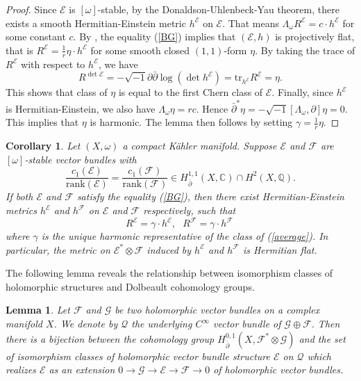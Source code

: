 \documentclass[english,reqno]{amsart}
\newcommand\sE{{\mathscr E}}
\newcommand\sF{{\mathscr F}}
\newcommand\sG{{\mathscr G}}
\newcommand\sQ{{\mathscr Q}}
\newcommand\bp{{\bar\partial}}
\theoremstyle{plain}
\newtheorem{lemma}[thm]{Lemma}
\newtheorem{cor}[thm]{Corollary}
\theoremstyle{definition}
\numberwithin{equation}{section} %
\begin{document}
\begin{proof}
    Since $\sE$ is $[\omega]$-stable, by the
    Donaldson-Uhlenbeck-Yau theorem, there exists a smooth
    Hermitian-Einstein metric $h^\sE$ on $\sE$. That means $\Lambda_\omega
    R^\sE=c\cdot h^\sE$ for some constant $c$. By \cite[Theorem 4.4.7]{Kobayashi2014}, the equality (\ref{BG}) implies that
    $(\sE,h)$ is  projectively flat, that is $R^\sE=\frac{1}{r} \eta \cdot h^\sE$
    for some  smooth closed $(1,1)$-form $\eta$. By taking the trace of $R^\sE$ with
    respect to $h^\sE$, we have $$R^{\det \sE}=-\sqrt{-1} \partial \bp\log(\det
    h^\sE)=\mathrm{tr}_{h^\sE} R^\sE=\eta.$$ This shows that class of  $\eta$ is equal to the first Chern class of $\sE$.
    Finally, since $h^\sE$ is Hermitian-Einstein, we also have
    $\Lambda_\omega \eta=rc$.
    Hence  $\bp^*\eta=-\sqrt{-1}[\Lambda_\omega,\partial]\eta=0$. This implies that $\eta$ is  harmonic. The lemma then follows by setting $\gamma=\frac{1}{r}\eta.$
\end{proof}



\begin{cor}\label{DUY}
    Let $(X,\omega)$ a compact K\"ahler manifold. Suppose $\sE$ and $\sF$
    are $[\omega]$-stable vector bundles with
    \begin{equation}\label{average}
    \frac{c_1(\sE)}{\mathrm{rank}(\sE)}=\frac{c_1(\sF)}{\mathrm{rank}(\sF)}\in
    H_{\bp}^{1,1}(X,\mathbb{C})\cap H^2(X,\mathbb{Q}).
    \end{equation}
    If both $\sE$
    and $\sF$ satisfy the equality (\ref{BG}), then there exist Hermitian-Einstein
    metrics $h^\sE$ and $h^\sF$ on $\sE$ and $\sF$ respectively, such that
    \begin{equation*}
    R^\sE=\gamma \cdot h^\sE,\ \ \ R^\sF=\gamma \cdot h^\sF\
    \end{equation*}  where $\gamma$
    is the unique harmonic representative of the class of
    (\ref{average}).  In particular, the metric on $\sE^*\otimes \sF$ induced by $h^\sE$ and $h^\sF$ is Hermitian flat.
\end{cor}

The following lemma reveals the relationship between  isomorphism classes of holomorphic structures and Dolbeault cohomology groups.

\begin{lemma}
    \label{lemma:coh-class-iso-holomorphic-class}
    Let $\sF$ and $\sG$ be  two holomorphic  vector bundles on a complex manifold $X$.  We denote by $\sQ$ the underlying $C^\infty$ vector bundle of $\sG \oplus \sF.$
    Then there is a bijection between  the cohomology group $H^{0,1}_{\bp}(X, \sF^*\otimes \sG)$ and the   set  of isomorphism classes of holomorphic vector bundle structure $\sE$  on $\sQ$ which realizes $\sE$  as an extension  $0\to \sG \to \sE \to \sF \to 0$ of holomorphic vector bundles.
\end{lemma}
\end{document}
